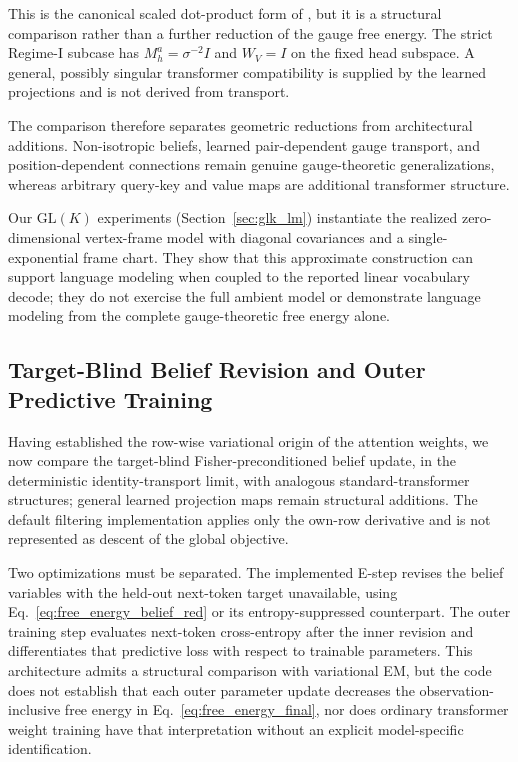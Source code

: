 \documentclass[twoside,11pt]{article}
\begin{document}
This is the canonical scaled dot-product form of \citet{vaswani2017attention}, but it is a structural comparison rather than a further reduction of the gauge free energy. The strict Regime-I subcase has $M_h^a = \sigma^{-2}I$ and $W_V=I$ on the fixed head subspace. A general, possibly singular transformer compatibility is supplied by the learned projections and is not derived from transport.

The comparison therefore separates geometric reductions from architectural additions. Non-isotropic beliefs, learned pair-dependent gauge transport, and position-dependent connections remain genuine gauge-theoretic generalizations, whereas arbitrary query-key and value maps are additional transformer structure.

Our $\mathrm{GL}(K)$ experiments (Section~\ref{sec:glk_lm}) instantiate the realized zero-dimensional vertex-frame model with diagonal covariances and a single-exponential frame chart. They show that this approximate construction can support language modeling when coupled to the reported linear vocabulary decode; they do not exercise the full ambient model or demonstrate language modeling from the complete gauge-theoretic free energy alone.

\subsection{Target-Blind Belief Revision and Outer Predictive Training}

Having established the row-wise variational origin of the attention weights, we now compare the target-blind Fisher-preconditioned belief update, in the deterministic identity-transport limit, with analogous standard-transformer structures; general learned projection maps remain structural additions. The default filtering implementation applies only the own-row derivative and is not represented as descent of the global objective.

Two optimizations must be separated. The implemented E-step revises the belief variables with the held-out next-token target unavailable, using Eq.~\eqref{eq:free_energy_belief_red} or its entropy-suppressed counterpart. The outer training step evaluates next-token cross-entropy after the inner revision and differentiates that predictive loss with respect to trainable parameters. This architecture admits a structural comparison with variational EM, but the code does not establish that each outer parameter update decreases the observation-inclusive free energy in Eq.~\eqref{eq:free_energy_final}, nor does ordinary transformer weight training have that interpretation without an explicit model-specific identification.
\end{document}
